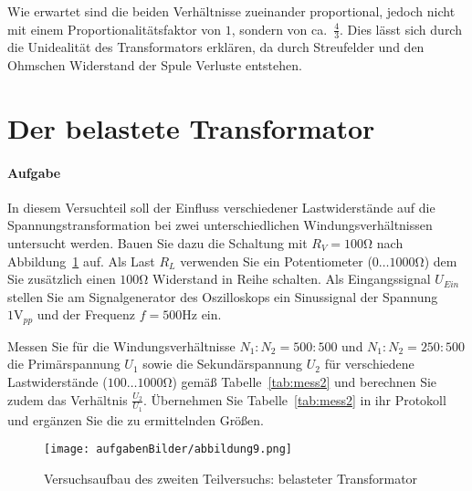 \documentclass[10pt]{scrreprt}
\begin{document}
        Wie erwartet sind die beiden Verhältnisse zueinander proportional, jedoch
        nicht mit einem Proportionalitätsfaktor von $1$, sondern von ca.~$\frac{4}{3}$.
        Dies lässt sich durch die Unidealität des Transformators erklären, da durch
        Streufelder und den Ohmschen Widerstand der Spule Verluste entstehen.


        \section{Der belastete Transformator}
        \paragraph{Aufgabe}
        In diesem Versuchteil soll der Einfluss verschiedener Lastwiderstände auf die
        Spannungstransformation bei zwei unterschiedlichen Windungsverhältnissen untersucht werden.
        Bauen Sie dazu die Schaltung mit $R_V = 100\si{\ohm}$ nach Abbildung~\ref{fig:abb9} auf. Als Last $R_L$ verwenden Sie ein
        Potentiometer ($0\ldots1000\si{\ohm}$) dem Sie zusätzlich einen $100\si{\ohm}$ Widerstand in Reihe schalten.
        Als Eingangssignal $U_{Ein}$ stellen Sie am Signalgenerator des Oszilloskops ein Sinussignal
        der Spannung $1 \si{\volt}_{pp}$ und der Frequenz $f = 500\si{\hertz}$ ein.

        \vspace{0.5cm}

        Messen Sie für die Windungsverhältnisse $N_1 : N_2 = 500 : 500$ und $N_1 : N_2 = 250 : 500$
        die Primärspannung $U_1$ sowie die Sekundärspannung $U_2$ für verschiedene Lastwiderstände
        ($100\ldots1000\si{\ohm}$) gemäß Tabelle~\ref{tab:mess2} und berechnen Sie zudem das Verhältnis $\frac{U_2}{U_1}$.
        Übernehmen Sie Tabelle~\ref{tab:mess2} in ihr Protokoll und ergänzen Sie die zu ermittelnden Größen.

        \begin{center}
            \begin{figure}[H]
                \texttt{[image: aufgabenBilder/abbildung9.png]}
                \caption{Versuchsaufbau des zweiten Teilversuchs: belasteter Transformator}
                \label{fig:abb9}
            \end{figure}
        \end{center}
\end{document}
